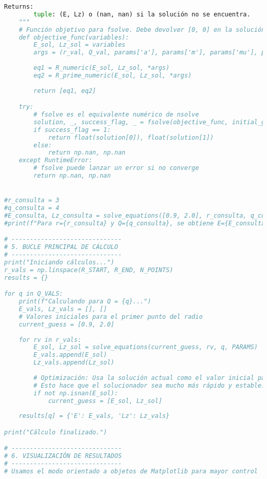 \begin{lstlisting}[language=Python, caption={Cálculo numérico de las constantes para órbitas circulares en Kerr}, label={lst:kerr_circular_orbits}]
    Returns:
        tuple: (E, Lz) o (nan, nan) si la solución no se encuentra.
    """
    # Función objetivo para fsolve. Debe devolver [0, 0] en la solución.
    def objective_func(variables):
        E_sol, Lz_sol = variables
        args = (r_val, Q_val, params['a'], params['m'], params['mu'], params['c'])
        
        eq1 = R_numeric(E_sol, Lz_sol, *args)
        eq2 = R_prime_numeric(E_sol, Lz_sol, *args)
        
        return [eq1, eq2]

    try:
        # fsolve es el equivalente numérico de nsolve
        solution, _, success_flag, _ = fsolve(objective_func, initial_guess, full_output=True)
        if success_flag == 1:
            return float(solution[0]), float(solution[1])
        else:
            return np.nan, np.nan
    except RuntimeError:
        # fsolve puede lanzar un error si no converge
        return np.nan, np.nan


#r_consulta = 3
#q_consulta = 4
#E_consulta, Lz_consulta = solve_equations([0.9, 2.0], r_consulta, q_consulta, PARAMS)
#print(f"Para r={r_consulta} y Q={q_consulta}, se obtiene E={E_consulta:.6f}, Lz={Lz_consulta:.6f}")

# ------------------------------
# 5. BUCLE PRINCIPAL DE CÁLCULO
# ------------------------------
print("Iniciando cálculos...")
r_vals = np.linspace(R_START, R_END, N_POINTS)
results = {}

for q in Q_VALS:
    print(f"Calculando para Q = {q}...")
    E_vals, Lz_vals = [], []
    # Valores iniciales para el primer punto del radio
    current_guess = [0.9, 2.0] 
    
    for rv in r_vals:
        E_sol, Lz_sol = solve_equations(current_guess, rv, q, PARAMS)
        E_vals.append(E_sol)
        Lz_vals.append(Lz_sol)
        
        # Optimización: Usa la solución actual como el valor inicial para el siguiente punto.
        # Esto hace que el solucionador sea mucho más rápido y estable.
        if not np.isnan(E_sol):
            current_guess = [E_sol, Lz_sol]
            
    results[q] = {'E': E_vals, 'Lz': Lz_vals}

print("Cálculo finalizado.")

# ------------------------------
# 6. VISUALIZACIÓN DE RESULTADOS
# ------------------------------
# Usamos el modo orientado a objetos de Matplotlib para mayor control




\end{lstlisting}
